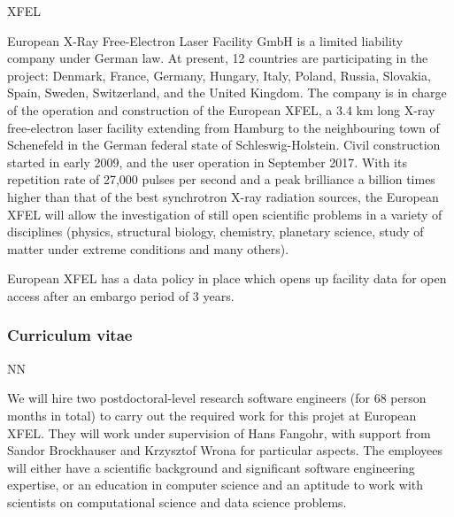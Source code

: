 \begin{sitedescription}{XFEL}
  \label{sitedescription:euxfel}



  European X-Ray Free-Electron Laser Facility GmbH is a limited
  liability company under German law. At present, 12 countries are
  participating in the project: Denmark, France, Germany, Hungary,
  Italy, Poland, Russia, Slovakia, Spain, Sweden, Switzerland, and the
  United Kingdom.  The company is in charge of the operation and
  construction of the European XFEL, a 3.4 km long X-ray free-electron
  laser facility extending from Hamburg to the neighbouring town of
  Schenefeld in the German federal state of Schleswig-Holstein. Civil
  construction started in early 2009, and the user operation in
  September 2017. With its repetition rate of 27,000 pulses per second
  and a peak brilliance a billion times higher than that of the best
  synchrotron X-ray radiation sources, the European XFEL will allow
  the investigation of still open scientific problems in a variety of
  disciplines (physics, structural biology, chemistry, planetary
  science, study of matter under extreme conditions and many others).

  European XFEL has a data policy in place \cite{datapolicy-euxfel}
  which opens up facility data for open access after an embargo period
  of 3 years.
\subsubsection*{Curriculum vitae}

%




%


\begin{participant}[PM=68, type=R]{NN}

We will hire two postdoctoral-level research software engineers (for 68 person
months in total) to carry out the required work for this projet at
European XFEL. They will work under supervision of Hans Fangohr, with
support from Sandor Brockhauser and Krzysztof Wrona for particular
aspects. The employees will either have a scientific background and
significant software engineering expertise, or an education in
computer science and an aptitude to work with scientists on
computational science and data science problems.
\end{participant}


\end{sitedescription}
